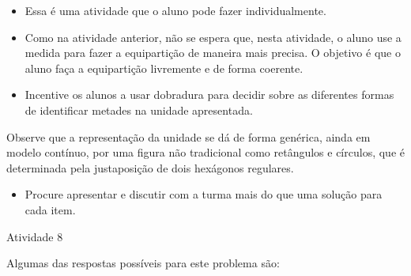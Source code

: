 \begin{multicols}{2}
   \vspace{.1cm}
  
\begin{itemize} %
    \item       Essa é uma atividade que o aluno pode fazer individualmente.
    \item       Como na atividade anterior, não se espera que, nesta atividade, o aluno use a medida para fazer a equipartição de maneira mais precisa. O objetivo é que o aluno faça a equipartição livremente e de forma coerente.
    \item       Incentive os alunos a usar dobradura para decidir sobre as diferentes formas de identificar metades na unidade apresentada.
\end{itemize} %

Observe que a representação da unidade se dá de forma genérica, ainda em modelo contínuo, por uma figura não tradicional como retângulos e círculos, que é determinada pela justaposição de dois hexágonos regulares.

\begin{itemize} %
    \item       Procure apresentar e discutir com a turma mais do que uma solução para cada item.
\end{itemize} %

\begin{resposta*}{Atividade 8}

Algumas das respostas possíveis para este problema são:
\begin{center}
\hspace{.2cm}


\end{center}
\end{resposta*}
\end{multicols}
